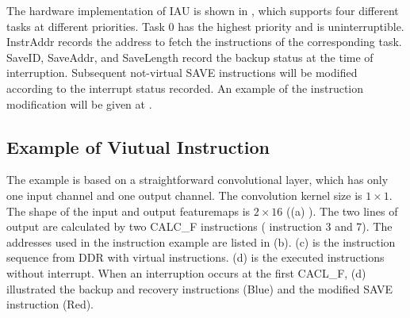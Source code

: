 The hardware implementation of IAU is shown in , which supports four different tasks at different priorities. Task 0 has the highest priority and is uninterruptible. InstrAddr records the address to fetch the instructions of the corresponding task. SaveID, SaveAddr, and SaveLength record the backup status at the time of interruption. 
Subsequent not-virtual SAVE instructions will be modified according to the interrupt status recorded.
An example of the instruction modification will be given at .


\subsection{Example of Viutual Instruction}
\label{sec:exampleVirtual}


The example is based on a straightforward convolutional layer, which has only one input channel and one output channel. 
The convolution kernel size is $1 \times 1$. The shape of the input and output featuremaps is $ 2 \times 16 $ ((a) ). The two lines of output are calculated by two CALC\_F instructions ( instruction 3 and 7). The addresses used in the instruction example are listed in (b). (c) is the instruction sequence from DDR with virtual instructions. (d) is the executed instructions without interrupt. When an interruption occurs at the first CACL\_F, (d) illustrated the backup and recovery instructions (Blue) and the modified SAVE instruction (Red).

